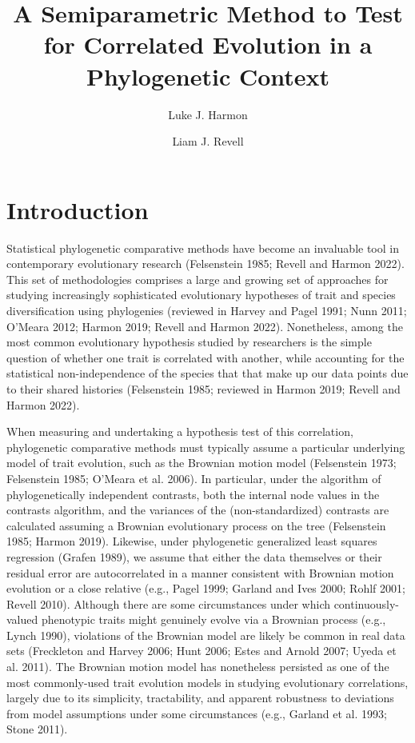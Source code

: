 \documentclass[fleqn,10pt,lineno]{wlpeerj} %
\title{A Semiparametric Method to Test for Correlated Evolution in a Phylogenetic Context}
\author[1]{Luke J. Harmon}
\author[2]{Liam J. Revell}
\affil[1]{Department of Biological Sciences, University of Idaho, Moscow, ID, USA}
\affil[2]{Department of Biology, University of Massachusetts Boston, Boston, MA, USA}
\begin{document}
\flushbottom
\maketitle
\thispagestyle{empty}

\section{Introduction}\label{introduction}

Statistical phylogenetic comparative methods have become an invaluable tool in contemporary evolutionary research (Felsenstein 1985; Revell and Harmon 2022). This set of methodologies comprises a large and growing set of approaches for studying increasingly sophisticated evolutionary hypotheses of trait and species diversification using phylogenies (reviewed in Harvey and Pagel 1991; Nunn 2011; O'Meara 2012; Harmon 2019; Revell and Harmon 2022). Nonetheless, among the most common evolutionary hypothesis studied by researchers is the simple question of whether one trait is correlated with another, while accounting for the statistical non-independence of the species that that make up our data points due to their shared histories (Felsenstein 1985; reviewed in Harmon 2019; Revell and Harmon 2022).

When measuring and undertaking a hypothesis test of this correlation, phylogenetic comparative methods must typically assume a particular underlying model of trait evolution, such as the Brownian motion model (Felsenstein 1973; Felsenstein 1985; O'Meara et al. 2006). In particular, under the algorithm of phylogenetically independent contrasts, both the internal node values in the contrasts algorithm, and the variances of the (non-standardized) contrasts are calculated assuming a Brownian evolutionary process on the tree (Felsenstein 1985; Harmon 2019). Likewise, under phylogenetic generalized least squares regression (Grafen 1989), we assume that either the data themselves or their residual error are autocorrelated in a manner consistent with Brownian motion evolution or a close relative (e.g., Pagel 1999; Garland and Ives 2000; Rohlf 2001; Revell 2010). Although there are some circumstances under which continuously-valued phenotypic traits might genuinely evolve via a Brownian process (e.g., Lynch 1990), violations of the Brownian model are likely be common in real data sets (Freckleton and Harvey 2006; Hunt 2006; Estes and Arnold 2007; Uyeda et al. 2011). The Brownian motion model has nonetheless persisted as one of the most commonly-used trait evolution models in studying evolutionary correlations, largely due to its simplicity, tractability, and apparent robustness to deviations from model assumptions under some circumstances (e.g., Garland et al. 1993; Stone 2011).
\end{document}
